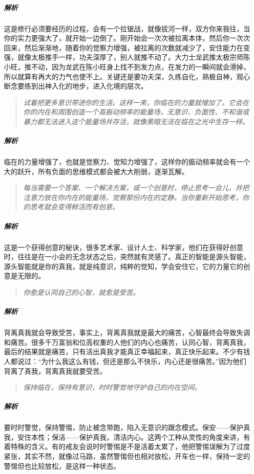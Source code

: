 \subparagraph{解析} 这是修行必须要经历的过程，会有一个拉锯战，就像拔河一样，双方你来我往，当你的实力更强大了，就开始一边倒了。刚开始会一次次被拉离本体，然后你一次次回来，然后渐渐地，随着你的觉察力增强，被拉离的次数就减少了，安住能力在变强，就像太极推手一样，功夫深厚了，别人就推不动了。大力士龙武推太极宗师陈小旺，推不动，因为龙武在陈小旺身上找不到发力点，在发力的一瞬间就会滑掉，所以就算有再大的力气也使不上。关键还是要功夫深，久练自化，熟极自神，观心断念要练到出神入化的地步，进入化境的层次。

\begin{quote}\it
    试着把更多意识带进你的生活。这样一来，你临在的力量就增加了。它会在你的内在和周围创造一个高振动频率的能量场，无意识、负面性、不和谐或暴力都无法进入这个能量场并存活，就像黑暗无法在临在之光中生存一样。
\end{quote}

\subparagraph{解析} 临在的力量增强了，也就是觉察力、觉知力增强了，这样你的振动频率就会有一个大的跃升，所有负面的思维模式都会被大大削弱，逐渐瓦解。

\begin{quote}\it
    每当需要一个答案、一个解决方案，或一个创意时，停止思考一会儿，并把注意力放在你内在的能量场，觉察那份内在的定静。当你重新开始思考，你的思考就会变得鲜活而有创意。
\end{quote}

\subparagraph{解析} 这是一个获得创意的秘诀，很多艺术家、设计人士、科学家，他们在获得好创意时，往往是在一小会的无念状态之后，突然就有灵感了。真正的智能是源头智能，源头智能就是你的真我，就是纯意识，纯粹的觉知，学会安住它，它的力量它的创意是无限的。

\begin{quote}\it
    你愈是认同自己的心智，就愈是受苦。
\end{quote}

\subparagraph{解析} 背离真我就会导致受苦，事实上，背离真我就是最大的痛苦，心智最终会导致失调和痛苦。很多千万富翁和位高权重的人他们的内心也痛苦，认同心智，背离真我，最后的结果就是痛苦，只有活出真我才能真正幸福起来，真正快乐起来。不少有钱人都说过：“为什么我这么有钱，但还是那么不快乐，内心还是很痛苦。”因为他们背离了真我，背离真我就要受苦。

\begin{quote}\it
    保持临在，保持有意识，时时警觉地守护自己的内在空间。
\end{quote}

\subparagraph{解析} 要时时警觉，保持警惕，防止被念带跑，陷入无意识的跟念模式。保安——保护真我，安住本性；保洁——保护真我，清洁内心。这两个工种从灵性的角度来讲，有着特殊的含义。有的戒友会说时时警惕是不是活着太累了，他把警惕误解为了过度紧张，其实不然，就像过马路，虽然警惕但也相对放松，开车也一样，保持一定的警惕但也比较放松，是这样一种状态。

